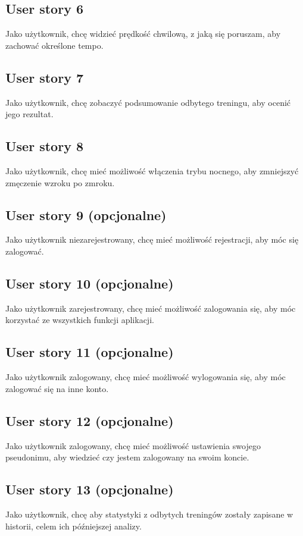\documentclass[a4paper]{article}
\begin{document}
\subsection{User story 6}
Jako użytkownik, chcę widzieć prędkość chwilową, z jaką się poruszam, aby zachować określone tempo.

\subsection{User story 7}
Jako użytkownik, chcę zobaczyć podsumowanie odbytego treningu, aby ocenić jego rezultat.

\subsection{User story 8}
Jako użytkownik, chcę mieć możliwość włączenia trybu nocnego, aby zmniejszyć zmęczenie wzroku po zmroku.

\subsection{User story 9 (opcjonalne)}
Jako użytkownik niezarejestrowany, chcę mieć możliwość rejestracji, aby móc się zalogować.

\subsection{User story 10 (opcjonalne)}
Jako użytkownik zarejestrowany, chcę mieć możliwość zalogowania się, aby móc korzystać ze wszystkich funkcji aplikacji.

\subsection{User story 11 (opcjonalne)}
Jako użytkownik zalogowany, chcę mieć możliwość wylogowania się, aby móc zalogować się na inne konto.

\subsection{User story 12 (opcjonalne)}
Jako użytkownik zalogowany, chcę mieć możliwość ustawienia swojego pseudonimu, aby wiedzieć czy jestem zalogowany na swoim koncie.

\subsection{User story 13 (opcjonalne)}
Jako użytkownik, chcę aby statystyki z odbytych treningów zostały zapisane w historii, celem ich późniejszej analizy.
\end{document}
